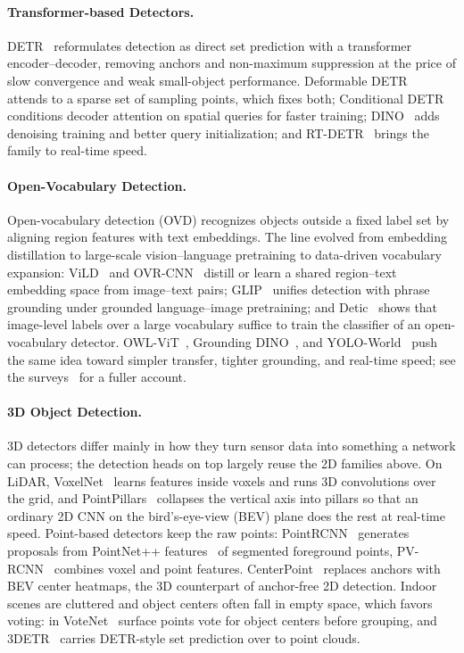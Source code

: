 \paragraph{Transformer-based Detectors.}
DETR~\cite{carion2020end} reformulates detection as direct set prediction with a transformer encoder--decoder, removing anchors and non-maximum suppression at the price of slow convergence and weak small-object performance. Deformable DETR~\cite{Zhu2021DeformableDETR} attends to a sparse set of sampling points, which fixes both; Conditional DETR~\cite{meng2021conditional} conditions decoder attention on spatial queries for faster training; DINO~\cite{zhang2023dino} adds denoising training and better query initialization; and RT-DETR~\cite{zhao2024detrs} brings the family to real-time speed.

\paragraph{Open-Vocabulary Detection.}
Open-vocabulary detection (OVD) recognizes objects outside a fixed label set by aligning region features with text embeddings. The line evolved from embedding distillation to large-scale vision--language pretraining to data-driven vocabulary expansion: ViLD~\cite{gu2021open} and OVR-CNN~\cite{zareian2021ovrcnn} distill or learn a shared region--text embedding space from image--text pairs; GLIP~\cite{li2022grounded} unifies detection with phrase grounding under grounded language--image pretraining; and Detic~\cite{zhou2022detecting} shows that image-level labels over a large vocabulary suffice to train the classifier of an open-vocabulary detector. OWL-ViT~\cite{minderer2022simple}, Grounding DINO~\cite{liu2024grounding}, and YOLO-World~\cite{cheng2024yoloworld} push the same idea toward simpler transfer, tighter grounding, and real-time speed; see the surveys~\cite{zhu2024survey, wu2024towards} for a fuller account.

\paragraph{3D Object Detection.}
3D detectors differ mainly in how they turn sensor data into something a network can process; the detection heads on top largely reuse the 2D families above. On LiDAR, VoxelNet~\cite{zhou2018voxelnet} learns features inside voxels and runs 3D convolutions over the grid, and PointPillars~\cite{lang2019pointpillars} collapses the vertical axis into pillars so that an ordinary 2D CNN on the bird's-eye-view (BEV) plane does the rest at real-time speed. Point-based detectors keep the raw points: PointRCNN~\cite{shi2019pointrcnn} generates proposals from PointNet++ features~\cite{qi2017pointnetplus} of segmented foreground points, PV-RCNN~\cite{shi2020pvrcnn} combines voxel and point features. CenterPoint~\cite{yin2021center} replaces anchors with BEV center heatmaps, the 3D counterpart of anchor-free 2D detection. Indoor scenes are cluttered and object centers often fall in empty space, which favors voting: in VoteNet~\cite{qi2019votenet} surface points vote for object centers before grouping, and 3DETR~\cite{misra20213detr} carries DETR-style set prediction over to point clouds.

